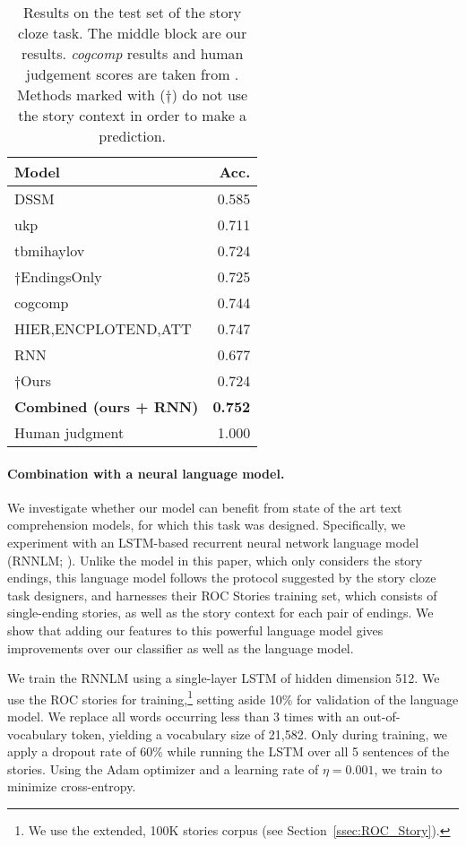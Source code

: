 \documentclass[11pt,a4paper]{article}
\newcommand{\secref}[1]{Section~\ref{ssec:#1}}
\begin{document}
\begin{table}[!t]
\small
\begin{center}
\begin{tabular}{|l|r|} \hline
{\bf Model} & {\bf Acc.} \\ \hline
{DSSM} \cite{Mostafazadeh:2016} & 0.585 \\ 
{ukp} \cite{Mihaylov:2017} & 0.711\\ 
{tbmihaylov} \cite{Mihaylov:2017} & 0.724\\ 
$\dagger$EndingsOnly \cite{Cai:2017} & 0.725 \\
{cogcomp}  & 0.744 \\ 
{HIER,ENCPLOTEND,ATT} \cite{Cai:2017} & 0.747 \\\hline\hline
{RNN}		& 0.677 \\ 
$\dagger${Ours} & {0.724} \\ 
{\bf Combined (ours + RNN)} & {\bf 0.752} \\ \hline\hline
Human judgment & 1.000 \\ \hline
\end{tabular}
\end{center}
\caption{\label{cloze_results} Results on the test set of the  story cloze task.
The middle block are our results.
{\it cogcomp} results and human judgement scores are taken from \citet{Mostafazadeh:2017}.
Methods marked with ($\dagger$) do not use the story context in order to make a prediction.}
\end{table}


\paragraph{Combination with a neural language model.}
We investigate whether our model can benefit from state of the art text comprehension models, for which this task was designed. 
Specifically, we experiment with an LSTM-based \cite{hochreiter1997long} recurrent neural network language model (RNNLM; \citealp{mikolov2010recurrent}). 
Unlike the model in this paper, which only considers the story endings, this language model follows the protocol suggested by the story cloze task designers, and harnesses their ROC Stories training set, which consists of single-ending stories, 
as well as the story context for each pair of endings. 
We show that adding our features to this powerful language model
gives improvements over our classifier as well as the language
model. 


We train the RNNLM using a single-layer LSTM of hidden dimension 512.
We use the ROC stories for training,\footnote{We use the extended, 100K stories corpus (see \secref{ROC_Story}).} setting aside 10\% for validation of the language model. 
We replace all words occurring less than 3 times with an 
out-of-vocabulary token, yielding a vocabulary size of  21,582.
Only during training, we apply a dropout rate of 60\% while running the LSTM over all 5 sentences of the stories. 
Using the Adam optimizer \cite{kingma2014adam} and a learning rate of
$\eta=0.001$, we train to minimize cross-entropy. 
\end{document}
